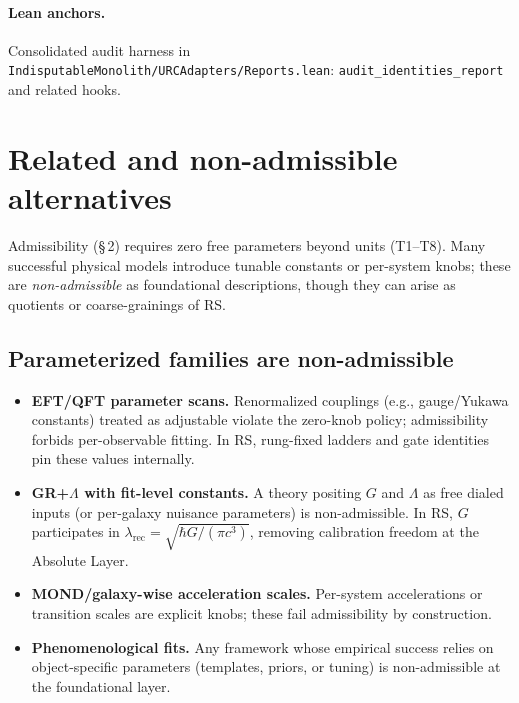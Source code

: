 \documentclass[11pt]{article}
\begin{document}
\paragraph{Lean anchors.} Consolidated audit harness in \texttt{IndisputableMonolith/URCAdapters/Reports.lean}: \texttt{audit\_identities\_report} and related hooks.

\section{Related and non\mbox{-}admissible alternatives}
Admissibility (\S\,2) requires zero free parameters beyond units (T1--T8). Many successful physical models introduce tunable constants or per\mbox{-}system knobs; these are \emph{non\mbox{-}admissible} as foundational descriptions, though they can arise as quotients or coarse\mbox{-}grainings of RS.

\subsection{Parameterized families are non\mbox{-}admissible}
\begin{itemize}
  \item \textbf{EFT/QFT parameter scans.} Renormalized couplings (e.g., gauge/Yukawa constants) treated as adjustable violate the zero\mbox{-}knob policy; admissibility forbids per\mbox{-}observable fitting. In RS, rung\mbox{-}fixed ladders and gate identities pin these values internally.
  \item \textbf{GR+\(\Lambda\) with fit\mbox{-}level constants.} A theory positing \(G\) and \(\Lambda\) as free dialed inputs (or per\mbox{-}galaxy nuisance parameters) is non\mbox{-}admissible. In RS, \(G\) participates in \(\lambda_{\mathrm{rec}}=\sqrt{\hbar G/(\pi c^3)}\), removing calibration freedom at the Absolute Layer.
  \item \textbf{MOND/galaxy\mbox{-}wise acceleration scales.} Per\mbox{-}system accelerations or transition scales are explicit knobs; these fail admissibility by construction.
  \item \textbf{Phenomenological fits.} Any framework whose empirical success relies on object\mbox{-}specific parameters (templates, priors, or tuning) is non\mbox{-}admissible at the foundational layer.
\end{itemize}
\end{document}
